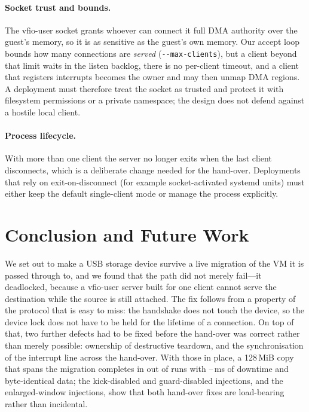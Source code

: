 \documentclass[10pt,conference]{IEEEtran}
\newcommand{\code}[1]{\texttt{#1}}
\begin{document}
\paragraph{Socket trust and bounds.}
The vfio-user socket grants whoever can connect it full DMA authority over the
guest's memory, so it is as sensitive as the guest's own memory. Our accept
loop bounds how many connections are \emph{served} (\code{-{}-max-clients}), but
a client beyond that limit waits in the listen backlog, there is no per-client
timeout, and a client that registers interrupts becomes the owner and may then
unmap DMA regions. A deployment must therefore treat the socket as trusted and
protect it with filesystem permissions or a private namespace; the design does
not defend against a hostile local client.

\paragraph{Process lifecycle.}
With more than one client the server no longer exits when the last client
disconnects, which is a deliberate change needed for the hand-over. Deployments
that rely on exit-on-disconnect (for example socket-activated systemd units)
must either keep the default single-client mode or manage the process
explicitly.

\section{Conclusion and Future Work}
\label{sec:conclusion}

We set out to make a USB storage device survive a live migration of the VM it
is passed through to, and we found that the path did not merely fail---it
deadlocked, because a vfio-user server built for one client cannot serve the
destination while the source is still attached. The fix follows from a
property of the protocol that is easy to miss: the handshake does not touch the
device, so the device lock does not have to be held for the lifetime of a
connection. On top of that, two further defects had to be fixed before the
hand-over was correct rather than merely possible: ownership of destructive
teardown, and the synchronisation of the interrupt line across the hand-over.
With those in place, a 128\,MiB copy that spans the migration completes in
\PassCount{} out of \TotalRuns{} runs with \DowntimeMin--\DowntimeMax\,ms of
downtime and byte-identical data; the kick-disabled and guard-disabled
injections, and the enlarged-window injections, show that both hand-over fixes
are load-bearing rather than incidental.
\end{document}

